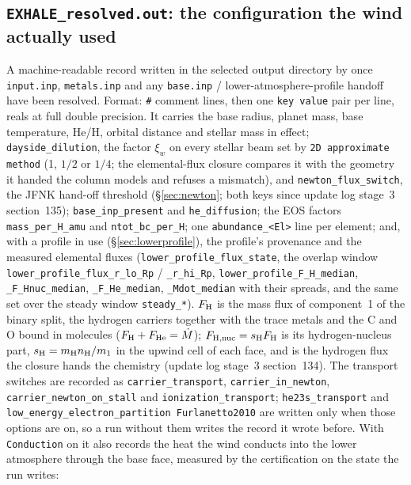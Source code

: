 \documentclass[english,a4paper]{my_memo}
\begin{document}
\subsection{\texttt{EXHALE\_resolved.out}: the configuration the wind
actually used}\label{sec:resolvedout}
A machine-readable record written in the selected output directory by
 once \texttt{input.inp}, \texttt{metals.inp}
and any \texttt{base.inp} / lower-atmosphere-profile handoff have been
resolved. Format: \texttt{\#} comment lines, then one \texttt{key\ value} pair
per line, reals at full double precision. It carries the base radius, planet
mass, base temperature, He/H, orbital distance and stellar mass in effect;
\texttt{dayside\_dilution}, the factor $\xi_w$ on every stellar beam set by
\texttt{2D approximate method} (1, $1/2$ or $1/4$; the elemental-flux closure
compares it with the geometry it handed the column models and refuses a
mismatch), and \texttt{newton\_flux\_switch}, the JFNK hand-off threshold
(\S\ref{sec:newton}; both keys since update log stage~3 section~135);
\texttt{base\_inp\_present} and \texttt{he\_diffusion}; the EOS factors
\texttt{mass\_per\_H\_amu} and \texttt{ntot\_bc\_per\_H}; one
\texttt{abundance\_<El>} line per element; and, with a profile in use
(\S\ref{sec:lowerprofile}), the profile's provenance and the measured
elemental fluxes (\texttt{lower\_profile\_flux\_state}, the overlap window
\texttt{lower\_profile\_flux\_r\_lo\_Rp} / \texttt{\_r\_hi\_Rp},
\texttt{lower\_profile\_F\_H\_median}, \texttt{\_F\_Hnuc\_median},
\texttt{\_F\_He\_median}, \texttt{\_Mdot\_median} with their spreads, and the
same set over the steady window \texttt{steady\_*}). $F_{\rm H}$ is the mass
flux of component~1 of the binary split, the hydrogen carriers together with
the trace metals and the C and O bound in molecules
($F_{\rm H}+F_{\rm He}=\dot M$); $F_{\rm H,nuc}=s_{\rm H}F_{\rm H}$ is its
hydrogen-nucleus part, $s_{\rm H}=m_{\rm H}n_{\rm H}/m_1$ in the upwind cell of
each face, and is the hydrogen flux the closure hands the chemistry (update
log stage~3 section~134). The transport switches are recorded as
\texttt{carrier\_transport}, \texttt{carrier\_in\_newton},
\texttt{carrier\_newton\_on\_stall} and \texttt{ionization\_transport};
\texttt{he23s\_transport} and
\texttt{low\_energy\_electron\_partition Furlanetto2010} are written only
when those options are on, so a run without them writes the record it wrote
before. With \texttt{Conduction} on it also records the heat the
wind conducts into the lower atmosphere through the base face, measured by
the certification on the state the run writes:
\end{document}
